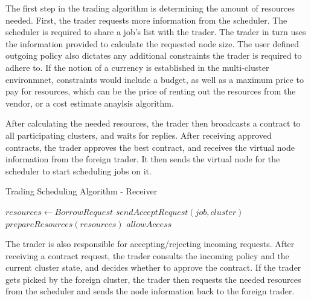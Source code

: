 The first step in the trading algorithm is determining the amount of resources
needed. First, the trader requests more information from the scheduler. The
scheduler is required to share a job's list with the trader. The trader in turn
uses the information provided to calculate the requested node size. The user
defined outgoing policy also dictates any additional constraints the trader is
required to adhere to. If the notion of a currency is established in the
multi-cluster environmnet, constraints would include a budget, as well as a
maximum price to pay for resources, which can be the price of renting out the
resources from the vendor, or a cost estimate anaylsis algorithm. 

After calculating the needed resources, the trader then broadcasts a contract
to all participating clusters, and waits for replies. After receiving approved
contracts, the trader approves the best contract, and receives the virtual node
information from the foreign trader. It then sends the virtual node for the
scheduler to start scheduling jobs on it.

\begin{algorithm}[H]
    \caption{Trading Scheduling Algorithm - Receiver}
    \begin{algorithmic}
            \State $ resources \gets BorrowRequest $  
            \State $sendAcceptRequest(job, cluster)$
            \State $prepareResources(resources)$
            \State $allowAccess$
            \EndIf
    \end{algorithmic}
\end{algorithm} 

The trader is also responsible for accepting/rejecting incoming requests. After
receiving a contract request, the trader consults the incoming policy and the
current cluster state, and decides whether to approve the contract. If the
trader gets picked by the foreign cluster, the trader then requests the needed
resources from the scheduler and sends the node information back to the foreign
trader.
\newpage


